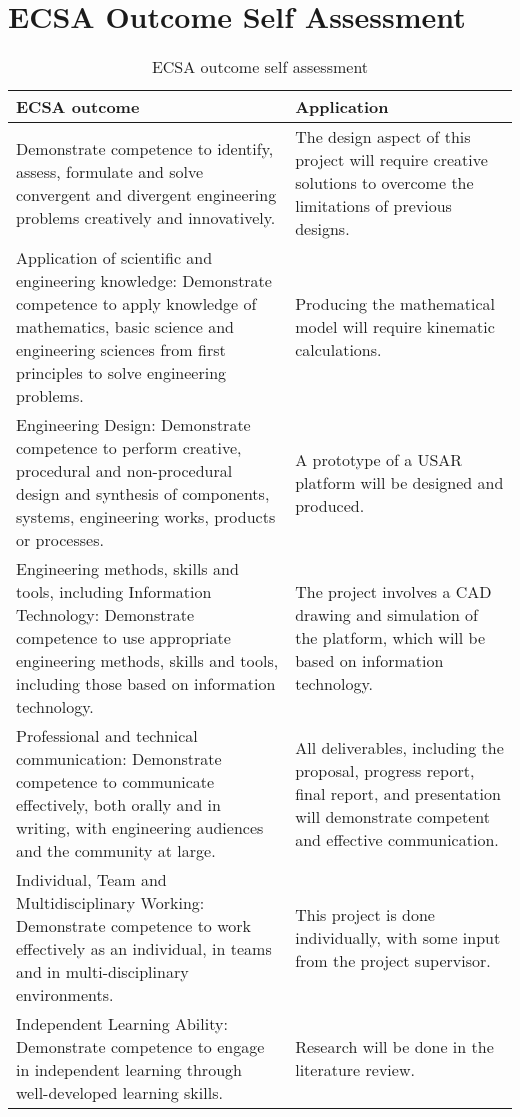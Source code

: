 \chapter{ECSA Outcome Self Assessment}

\begin{table}[h]
	\caption{ECSA outcome self assessment}
	\footnotesize
	\begin{tabular}{ | p{22em} | p{17em} |} 
		\hline
		ECSA outcome& Application \\ 
		\hline
		Demonstrate competence to identify, assess, formulate and solve convergent and
		divergent engineering problems creatively and innovatively. & 
		The design aspect of this project will require creative solutions to overcome the limitations of previous designs. \\ 
		\hline
		Application of scientific and engineering knowledge: Demonstrate competence to apply knowledge
		of mathematics, basic science and engineering sciences from first principles to solve engineering problems. & 
		Producing the mathematical model will require kinematic calculations. \\ 
		\hline
		Engineering Design: Demonstrate competence to perform creative, procedural and non-procedural design and synthesis of components, systems, engineering works, products or processes.& A prototype of a USAR platform will be designed and produced. \\ 
		\hline
		Engineering methods, skills and tools, including Information Technology: Demonstrate competence
		to use appropriate engineering methods, skills and tools, including those based on information technology. & 
		The project involves a CAD drawing and simulation of the platform, which will be based on information technology.\\ 
		\hline
		Professional and technical communication: Demonstrate competence to communicate effectively,
		both orally and in writing, with engineering audiences and the community at large. & 
		All deliverables, including the proposal, progress report, final report, and presentation will demonstrate competent and effective communication. \\ 
		\hline
		Individual, Team and Multidisciplinary Working: Demonstrate competence to work effectively as an
		individual, in teams and in multi-disciplinary environments. & 
		This project is done individually, with some input from the project supervisor. \\ 
		\hline
		Independent Learning Ability: Demonstrate competence to engage in independent learning through
		well-developed learning skills. & 
		Research will be done in the literature review. \\ 
		\hline
	\end{tabular}
\end{table}